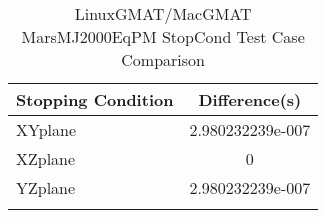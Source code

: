 \begin{table}[htbp!]
\centering
\caption{ LinuxGMAT/MacGMAT MarsMJ2000EqPM StopCond Test Case Comparison}
      \begin{tabular}{lc}
      \hline\hline
          Stopping Condition & Difference(s) \\
         \hline
         XYplane & 2.980232239e-007 \\
         XZplane & 0 \\
         YZplane & 2.980232239e-007 \\
      \hline\hline
      \label{Table: LinuxGMAT-MacGMAT MarsMJ2000EqPM StopCond Table} 
\end{tabular}
\end{table}
